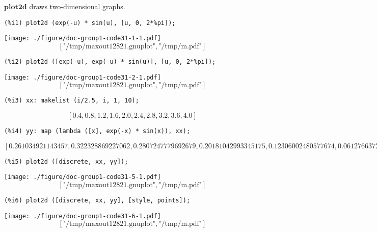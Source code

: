 \documentclass[12pt,leqno]{article}
\begin{document}
$\mathbf{plot2d}$ draws two-dimensional graphs.
\begin{verbatim}
(%i1) plot2d (exp(-u) * sin(u), [u, 0, 2*%pi]);
\end{verbatim}
\texttt{[image: ./figure/doc-group1-code31-1-1.pdf]}
\begin{dmath}[number={\(\mathop{\mathrm{\%o}_{1}}\)}]
\left[\text{"/tmp/maxout12821.gnuplot"}, \text{"/tmp/m.pdf"}\right]
\end{dmath}
\begin{verbatim}
(%i2) plot2d ([exp(-u), exp(-u) * sin(u)], [u, 0, 2*%pi]);
\end{verbatim}
\texttt{[image: ./figure/doc-group1-code31-2-1.pdf]}
\begin{dmath}[number={\(\mathop{\mathrm{\%o}_{2}}\)}]
\left[\text{"/tmp/maxout12821.gnuplot"}, \text{"/tmp/m.pdf"}\right]
\end{dmath}
\begin{verbatim}
(%i3) xx: makelist (i/2.5, i, 1, 10);
\end{verbatim}
\begin{dmath}[number={\(\mathop{\mathrm{\%o}_{3}}\)}]
\left[0.4, 0.8, 1.2, 1.6, 2.0, 2.4, 2.8, 3.2, 3.6, 4.0\right]
\end{dmath}
\begin{verbatim}
(%i4) yy: map (lambda ([x], exp(-x) * sin(x)), xx);
\end{verbatim}
\begin{dmath}[number={\(\mathop{\mathrm{\%o}_{4}}\)}]
\left[0.261034921143457, 0.322328869227062, 0.2807247779692679, 0.20181042993345175, 0.12306002480577674, 0.06127663726195732, 0.020370650389686513, -0.0023794587414574246, -0.012091305769841415, -0.013861321214152955\right]
\end{dmath}
\begin{verbatim}
(%i5) plot2d ([discrete, xx, yy]);
\end{verbatim}
\texttt{[image: ./figure/doc-group1-code31-5-1.pdf]}
\begin{dmath}[number={\(\mathop{\mathrm{\%o}_{5}}\)}]
\left[\text{"/tmp/maxout12821.gnuplot"}, \text{"/tmp/m.pdf"}\right]
\end{dmath}
\begin{verbatim}
(%i6) plot2d ([discrete, xx, yy], [style, points]);
\end{verbatim}
\texttt{[image: ./figure/doc-group1-code31-6-1.pdf]}
\begin{dmath}[number={\(\mathop{\mathrm{\%o}_{6}}\)}]
\left[\text{"/tmp/maxout12821.gnuplot"}, \text{"/tmp/m.pdf"}\right]
\end{dmath}
\end{document}
